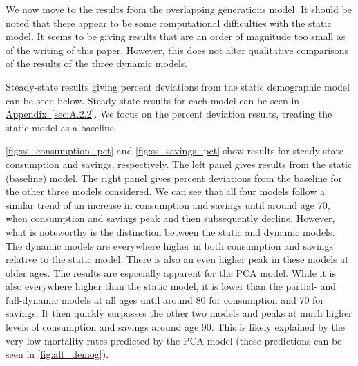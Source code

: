 \documentclass[10pt]{article}
\renewcommand{\thesection}{\arabic{section}}
\renewcommand{\thesubsection}{\thesection.\arabic{subsection}}
\newcommand{\aref}[1]{\hyperref[#1]{Appendix~\ref{#1}}}
\renewcommand{\section}[2][]{\oldsection[#1]{#2}\index{#1}\label{sec:\thesection}}
\renewcommand{\subsection}[2][]{\oldsubsection[#1]{#2}\index{#1}\label{sec:\thesubsection}}
\numberwithin{equation}{subsection}
\begin{document}
\par We now move to the results from the overlapping generations model. It should be noted that there appear to be some computational difficulties with the static model. It seems to be giving results that are an order of magnitude too small as of the writing of this paper. However, this does not alter qualitative comparisons of the results of the three dynamic models.

\subsection{Steady-State}

\par Steady-state results giving percent deviations from the static demographic model can be seen below. Steady-state results for each model can be seen in \aref{sec:A.2.2}. We focus on the percent deviation results, treating the static model as a baseline.

\par \autoref{fig:ss_consumption_pct} and \autoref{fig:ss_savings_pct} show results for steady-state consumption and savings, respectively. The left panel gives results from the static (baseline) model. The right panel gives percent deviations from the baseline for the other three models considered. We can see that all four models follow a similar trend of an increase in consumption and savings until around age 70, when consumption and savings peak and then subsequently decline. However, what is noteworthy is the distinction between the static and dynamic models. The dynamic models are everywhere higher in both consumption and savings relative to the static model. There is also an even higher peak in these models at older ages. The results are especially apparent for the PCA model. While it is also everywhere higher than the static model, it is lower than the partial- and full-dynamic models at all ages until around 80 for consumption and 70 for savings. It then quickly surpasses the other two models and peaks at much higher levels of consumption and savings around age 90. This is likely explained by the very low mortality rates predicted by the PCA model (these predictions can be seen in \autoref{fig:alt_demog}).
\end{document}
